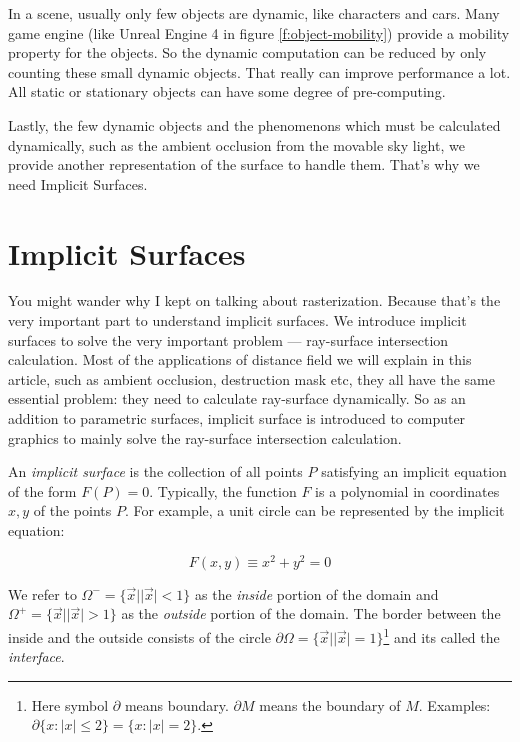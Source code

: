 In a scene, usually only few objects are dynamic, like characters and cars. Many game engine (like Unreal Engine 4 in figure \ref{f:object-mobility}) provide a mobility property for the objects. So the dynamic computation can be reduced by only counting these small dynamic objects. That really can improve performance a lot. All static or stationary objects can have some degree of pre-computing.

Lastly, the few dynamic objects and the phenomenons which must be calculated dynamically, such as the ambient occlusion from the movable sky light, we provide another representation of the surface to handle them. That's why we need Implicit Surfaces.

\section{Implicit Surfaces}

You might wander why I kept on talking about rasterization. Because that's the very important part to understand implicit surfaces. We introduce implicit surfaces to solve the very important problem --- ray-surface intersection calculation. Most of the applications of distance field we will explain in this article, such as ambient occlusion, destruction mask etc, they all have the same essential problem: they need to calculate ray-surface dynamically. So as an addition to parametric surfaces, implicit surface is introduced to computer graphics to mainly solve the ray-surface intersection calculation.

An \textit{implicit surface} is the collection of all points $P$ satisfying an implicit equation of the form $F(P)=0$. Typically, the function $F$ is a polynomial in coordinates $x,y$ of the points $P$. For example, a unit circle can be represented by the implicit equation: 

\begin{equation*}
	F(x,y)\equiv x^2+y^2=0
\end{equation*}

We refer to $\Omega^-=\{\vec{x}||\vec{x}|<1\}$ as the \textit{inside} portion of the domain and $\Omega^+=\{\vec{x}||\vec{x}|>1\}$ as the \textit{outside} portion of the domain. The border between the inside and the outside consists of the circle $\partial\Omega=\{\vec{x}||\vec{x}|=1\}$\footnote{Here symbol $\partial$ means boundary. $\partial M$ means the boundary of $M$. Examples: $\partial \{x:|x|\leq 2\}=\{x:|x|=2\}$.} and its called the \textit{interface}.

